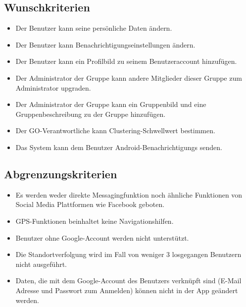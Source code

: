 \documentclass[parskip=full]{scrartcl}
\begin{document}
\subsection{Wunschkriterien}
\begin{itemize}
	\item Der Benutzer kann seine persönliche Daten ändern.
	\item Der Benutzer kann Benachrichtigungseinstellungen ändern.
	\item Der Benutzer kann ein Profilbild zu seinem Benutzeraccount hinzufügen. %
	\item Der Administrator der Gruppe kann andere Mitglieder dieser Gruppe zum Administrator upgraden.
	\item Der Administrator der Gruppe kann ein Gruppenbild und eine Gruppenbeschreibung zu der Gruppe hinzufügen.
	\item Der GO-Verantwortliche kann Clustering-Schwellwert bestimmen.
	\item Das System kann dem Benutzer \glspl{Android-Benachrichtigung} senden.
\end{itemize}

\subsection{Abgrenzungskriterien}
\begin{itemize}
\item Es werden weder direkte Messagingfunktion noch ähnliche Funktionen von Social Media Plattformen wie Facebook geboten.
\item GPS-Funktionen beinhaltet keine Navigationshilfen.
\item Benutzer ohne Google-Account werden nicht unterstützt.
\item Die Standortverfolgung wird im Fall von weniger 3 losgegangen Benutzern nicht ausgeführt. %
\item Daten, die mit dem Google-Account des Benutzers verknüpft sind (E-Mail Adresse und Passwort zum Anmelden) können nicht in der App geändert werden.
\end{itemize}
\end{document}
